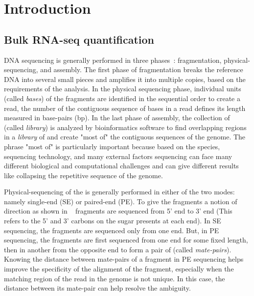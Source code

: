 
\chapter{Introduction} %
\label{intro} %


\section{Bulk RNA-seq quantification}
DNA sequencing is generally performed in three phases~\citep{schadt2010window}: fragmentation, physical-sequencing, and assembly. The first phase of fragmentation breaks the reference DNA into several small pieces and amplifies it into multiple copies, based on the requirements of the analysis. In the physical sequencing phase, individual units (called \textit{bases}) of the fragments are identified in the sequential order to create a read, the number of the contiguous sequence of bases in a read defines its length measured in base-pairs (bp). In the last phase of assembly, the collection of \reads (called \textit{library}) is analyzed by bioinformatics software to find overlapping regions in a \textit{library} of \reads and create "most of" the contiguous sequences of the genome. The phrase "most of" is particularly important because based on the species, sequencing technology, and many external factors sequencing can face many different biological and computational challenges and can give different results like collapsing the repetitive sequence of the genome.


\begin{figure*}[!htb]
\centering
\texttt{[image: rapmap/\{Avi.RPE.fig.4]}.pdf}
\caption{From top to bottom: Single-End Sequencing, Paired-End Sequencing, information retained after Paired-End sequencing.}
\label{fig:pe-seq}
\end{figure*}


Physical-sequencing of the \reads is generally performed in either of the two modes: namely single-end (SE) or paired-end (PE). To give the fragments a notion of direction as shown in ~ fragments are sequenced from 5' end to 3' end (This refers to the 5' and 3' carbons on the sugar presents at each end). In SE sequencing, the fragments are sequenced only from one end. But, in PE sequencing, the fragments are first sequenced from one end for some fixed length, then in another from the opposite end to form a pair of \reads (called \textit{mate-pairs}). Knowing the distance between mate-pairs of a fragment in PE sequencing helps improve the specificity of the alignment of the fragment, especially when the matching region of the read in the genome is not unique. In this case, the distance between its mate-pair can help resolve the ambiguity.


